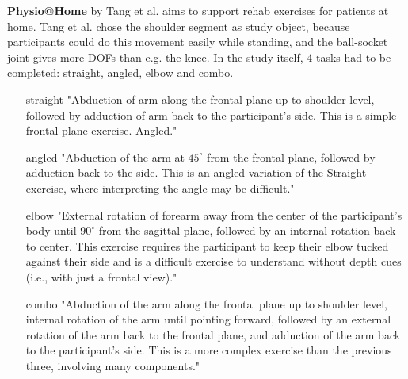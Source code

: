 \textbf{Physio@Home} by Tang et al. \cite{Tang2015} aims to support rehab exercises for patients at home. Tang et al. chose the shoulder segment as study object, because participants could do this movement easily while standing, and the ball-socket joint gives more DOFs than e.g. the knee. In the study itself, 4 tasks had to be completed: straight, angled, elbow and combo.
\begin{itemize}
	\item[straight] "Abduction of arm along the frontal plane up to shoulder level, followed by adduction of arm back to the participant’s side. This is a simple frontal plane exercise.
	Angled."
	\item[angled] "Abduction of the arm at $45^\circ$ from the frontal plane, followed by adduction back to the side. This is an angled variation of the Straight exercise, where interpreting the angle may be difficult."
	\item[elbow] "External rotation of forearm away from the center of the participant’s body until $90^\circ$ from the sagittal plane, followed by an internal rotation back to center. This exercise requires the participant to keep their elbow tucked against their side and is a difficult exercise to understand without depth cues (i.e., with just a frontal view)."
	\item[combo] "Abduction of the arm along the frontal plane up to shoulder level, internal rotation of the arm until pointing forward, followed by an external rotation of the arm back to the frontal plane, and adduction of the arm back to the participant’s side. This is a more complex exercise than the previous three, involving many components."
\end{itemize}

